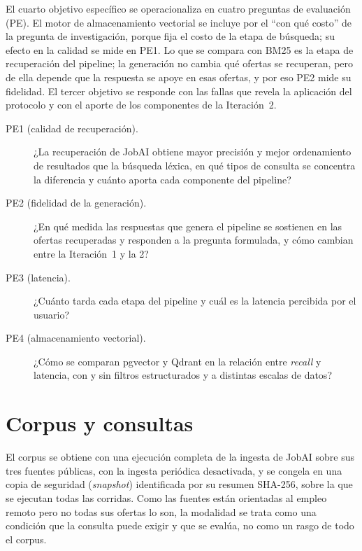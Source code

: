 El cuarto objetivo específico se operacionaliza en cuatro preguntas de evaluación (PE). El motor de almacenamiento vectorial se incluye por el \enquote{con qué costo} de la pregunta de investigación, porque fija el costo de la etapa de búsqueda; su efecto en la calidad se mide en PE1. Lo que se compara con BM25 es la etapa de recuperación del pipeline; la generación no cambia qué ofertas se recuperan, pero de ella depende que la respuesta se apoye en esas ofertas, y por eso PE2 mide su fidelidad. El tercer objetivo se responde con las fallas que revela la aplicación del protocolo y con el aporte de los componentes de la Iteración~2.

\begin{description}
    \item[PE1 (calidad de recuperación).] ¿La recuperación de JobAI obtiene mayor precisión y mejor ordenamiento de resultados que la búsqueda léxica, en qué tipos de consulta se concentra la diferencia y cuánto aporta cada componente del pipeline?
    \item[PE2 (fidelidad de la generación).] ¿En qué medida las respuestas que genera el pipeline se sostienen en las ofertas recuperadas y responden a la pregunta formulada, y cómo cambian entre la Iteración~1 y la 2?
    \item[PE3 (latencia).] ¿Cuánto tarda cada etapa del pipeline y cuál es la latencia percibida por el usuario?
    \item[PE4 (almacenamiento vectorial).] ¿Cómo se comparan pgvector y Qdrant en la relación entre \textit{recall} y latencia, con y sin filtros estructurados y a distintas escalas de datos?
\end{description}

\section{Corpus y consultas}
\label{sec:met-corpus}
\label{sec:met-consultas}
\label{sec:met-sistema}

El corpus se obtiene con una ejecución completa de la ingesta de JobAI sobre sus tres fuentes públicas, con la ingesta periódica desactivada, y se congela en una copia de seguridad (\textit{snapshot}) identificada por su resumen SHA-256, sobre la que se ejecutan todas las corridas. Como las fuentes están orientadas al empleo remoto pero no todas sus ofertas lo son, la modalidad se trata como una condición que la consulta puede exigir y que se evalúa, no como un rasgo de todo el corpus.

